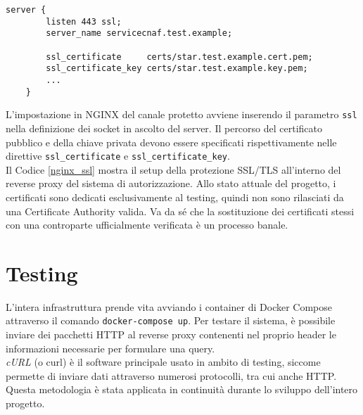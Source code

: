 \begin{lstlisting}[caption={[Configurazione della comunicazione tramite SSL/TLS]Configurazione della comunicazione tramite SSL/TLS nel reverse proxy.},captionpos=b,label=nginx_ssl]
    server {
        listen 443 ssl;
        server_name servicecnaf.test.example;

        ssl_certificate     certs/star.test.example.cert.pem;
        ssl_certificate_key certs/star.test.example.key.pem;
        ...
    }
\end{lstlisting}
L'impostazione in NGINX del canale protetto avviene inserendo il parametro \texttt{ssl} nella definizione 
dei socket in ascolto del server. Il percorso del certificato pubblico e della chiave privata devono essere specificati 
rispettivamente nelle direttive \texttt{ssl\_certificate} e \texttt{ssl\_certificate\_key}. \\
Il Codice \ref*{nginx_ssl} mostra il setup della protezione SSL/TLS all'interno del reverse proxy del sistema di autorizzazione.
Allo stato attuale del progetto, i certificati sono dedicati esclusivamente al testing, quindi non sono rilasciati da 
una Certificate Authority valida. Va da sé che 
la sostituzione dei certificati stessi
con una controparte ufficialmente verificata è un processo banale.
\raggedbottom  
\section{Testing}
L'intera infrastruttura prende vita avviando i container di Docker Compose attraverso il comando \texttt{docker-compose up}.
Per testare il sistema, è possibile inviare dei pacchetti HTTP al reverse proxy contenenti nel proprio header le informazioni necessarie per formulare una query.
\\ \textit{cURL} (o curl) \cite{curl} è il software principale usato in ambito di testing, siccome permette di inviare dati attraverso 
numerosi protocolli, tra cui anche HTTP. 
\\ Questa metodologia è stata applicata in continuità durante lo sviluppo dell'intero progetto. 